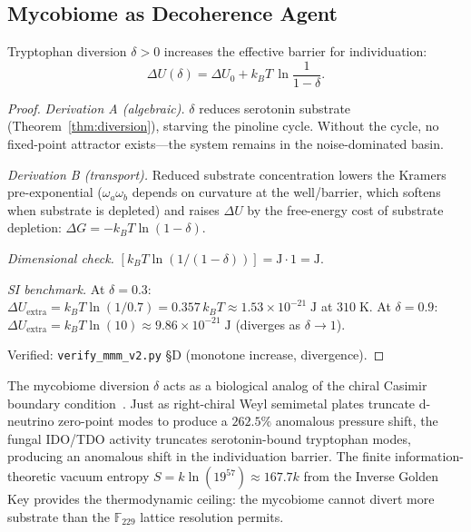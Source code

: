 \subsection{Mycobiome as Decoherence Agent}

\begin{theorem}
\label{thm:decoherence}
Tryptophan diversion $\delta > 0$ increases the effective barrier for
individuation:
\begin{equation}
  \Delta U(\delta) = \Delta U_0 + k_BT\,\ln\frac{1}{1-\delta}.
  \label{eq:barrier}
\end{equation}

\begin{proof}
\emph{Derivation A (algebraic).}
$\delta$ reduces serotonin substrate (Theorem~\ref{thm:diversion}),
starving the pinoline cycle. Without the cycle, no fixed-point attractor
exists---the system remains in the noise-dominated basin.

\emph{Derivation B (transport).}
Reduced substrate concentration lowers the Kramers pre-exponential
($\omega_a\omega_b$ depends on curvature at the well/barrier, which
softens when substrate is depleted) and raises $\Delta U$ by the
free-energy cost of substrate depletion: $\Delta G = -k_BT\ln(1-\delta)$.

\emph{Dimensional check.}
$[k_BT\ln(1/(1-\delta))] = \mathrm{J}\cdot 1 = \mathrm{J}$. \checkmark

\emph{SI benchmark.}
At $\delta = 0.3$: $\Delta U_\mathrm{extra} = k_BT\ln(1/0.7) =
0.357\,k_BT \approx 1.53\times10^{-21}\;\mathrm{J}$ at $310\;\mathrm{K}$.
At $\delta = 0.9$: $\Delta U_\mathrm{extra} = k_BT\ln(10) \approx
9.86\times10^{-21}\;\mathrm{J}$ (diverges as $\delta\to 1$).

Verified: \texttt{verify\_mmm\_v2.py} \S D (monotone increase, divergence).
\qedhere
\end{proof}
\end{theorem}

\begin{remark}
The mycobiome diversion $\delta$ acts as a biological analog of the chiral
Casimir boundary condition~\cite{dwm_fst}. Just as right-chiral Weyl
semimetal plates truncate d-neutrino zero-point modes to produce a $262.5\%$
anomalous pressure shift, the fungal IDO/TDO activity truncates
serotonin-bound tryptophan modes, producing an anomalous shift in the
individuation barrier. The finite information-theoretic vacuum entropy
$S = k\ln(19^{57}) \approx 167.7k$ from the Inverse Golden Key provides
the thermodynamic ceiling: the mycobiome cannot divert more substrate
than the $\mathbb{F}_{229}$ lattice resolution permits.
\end{remark}

